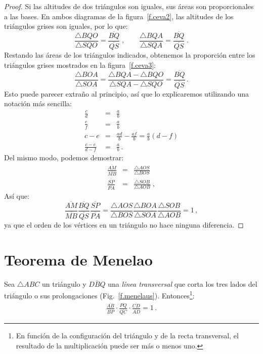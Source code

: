 \begin{proof} Si las altitudes de dos triángulos son iguales, sus áreas son proporcionales a las bases. En ambos diagramas de la figura~\ref{f.ceva2}, las altitudes de los triángulos grises son iguales, por lo que:
\[
\frac{\triangle BQO}{\triangle SQO} = \frac{\overline{BQ}}{\overline{QS}}\;,\quad\quad \frac{\triangle BQA}{\triangle SQA} = \frac{\overline{BQ}}{\overline{QS}}\;.
\]
Restando las áreas de los triángulos indicados, obtenemos la proporción entre los triángulos grises mostrados en la figura~\ref{f.ceva3}:
\[
\frac{\triangle BOA}{\triangle SOA}=\frac{\triangle BQA - \triangle BQO}{\triangle SQA-\triangle SQO} = \frac{\overline{BQ}}{\overline{QS}}\,.
\]
Esto puede parecer extraño al principio, así que lo explicaremos utilizando una notación más sencilla:
\begin{eqnarray*}
 \frac{c}{d} &=&\frac{a}{b}\\
 \frac{e}{f} &=&\frac{a}{b}\\
c-e &=& \frac{ad}{b} - \frac{af}{b}=\frac{a}{b}(d-f)\\
\frac{c-e}{d-f} &=& \frac{a}{b}\,.
\end{eqnarray*}
Del mismo modo, podemos demostrar:
\begin{eqnarray*}
\frac{\overline{AM}}{\overline{MB}} &=& \frac{\triangle AOS}{\triangle BOS}\\
\frac{\overline{SP}}{\overline{PA}} &=&\frac{\triangle SOB}{\triangle AOB}\;,
\end{eqnarray*}
Así que:
\[
\frac{\overline{AM}}{\overline{MB}}\frac{\overline{BQ}}{\overline{QS}}\frac{\overline{SP}}{\overline{PA}} = \frac{\triangle AOS}{\triangle BOS}\frac{\triangle BOA}{\triangle SOA}\frac{\triangle SOB}{\triangle AOB}=1\,,
\]
ya que el orden de los vértices en un triángulo no hace ninguna diferencia.
\end{proof}

\section{Teorema de Menelao}\label{a.menelaus}

\begin{theorem}[Menelao]\label{thm.menelaus}
Sea $\triangle ABC$ un triángulo y $\overline{DBQ}$ una \emph{línea transversal} que corta los tres lados del triángulo o sus prolongaciones (Fig.~\ref{f.menelaus}). Entonces\footnote{En función de la configuración del triángulo y de la recta transversal, el resultado de la multiplicación puede ser más o menos uno.}:
\begin{align}
\displaystyle\frac{\overline{AB}}{\overline{BP}}\cdot
\displaystyle\frac{\overline{PQ}}{\overline{QC}}\cdot
\displaystyle\frac{\overline{CD}}{\overline{AD}}=1\,.\label{eq.menelaus}
\end{align}
\end{theorem}

